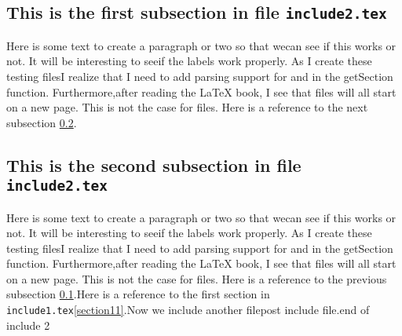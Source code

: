\subsection{This is the first subsection in file \texttt{include2.tex}}\label{section21}Here is some text to create a paragraph or two so that wecan see if this works or not.  It will be interesting to seeif the labels work properly.  As I create these testing filesI realize that I need to add parsing support for \verb##and \verb## in the getSection function.   Furthermore,after reading the \LaTeX{} book, I see that \verb## files will all start on a new page.  This is not the case for\verb## files.  Here is a reference to the next subsection \ref{section22}.\subsection{This is the second subsection in file \texttt{include2.tex}}\label{section22}Here is some text to create a paragraph or two so that wecan see if this works or not.  It will be interesting to seeif the labels work properly.  As I create these testing filesI realize that I need to add parsing support for \verb##and \verb## in the getSection function.   Furthermore,after reading the \LaTeX{} book, I see that \verb## files will all start on a new page.  This is not the case for\verb## files.  Here is a reference to the previous subsection \ref{section21}.Here is a reference to the first section in \texttt{include1.tex}\ref{section11}.Now we include another filepost include file.end of include 2